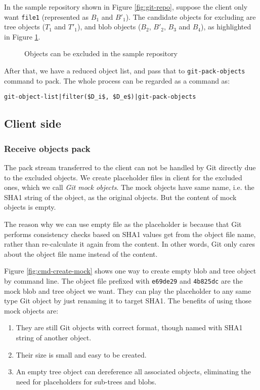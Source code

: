 \documentclass[preprint]{sigplanconf}
\begin{document}
In the sample repository shown in Figure \ref{fig:git-repo}, suppose the client only want \verb|file1| (represented as $B_1$ and $B'_1$).
The candidate objects for excluding are tree objects ($T_1$ and $T'_1$), and blob objects ($B_2$, $B'_2$, $B_3$ and $B_4$), as highlighted in Figure \ref{fig:find-obj-to-remove}.
\begin{figure}[htpb]
  \centering
  
  \caption{Objects can be excluded in the sample repository}
  \label{fig:find-obj-to-remove}
\end{figure}

After that, we have a reduced object list, and pass that to \verb|git-pack-objects| command to pack.
The whole process can be regarded as a command as:
\begin{verbatim}
git-object-list|filter($D_i$, $D_e$)|git-pack-objects
\end{verbatim}

\subsection{Client side}
\subsubsection{Receive objects pack}
The pack stream transferred to the client can not be handled by Git directly due to the excluded objects.
We create placeholder files in client for the excluded ones, which we call \emph{Git mock objects}.
The mock objects have same name, i.e. the SHA1 string of the object, as the original objects.
But the content of mock objects is empty.

The reason why we can use empty file as the placeholder is because that Git performs consistency checks based on SHA1 values get from the object file name, rather than re-calculate it again from the content. In other words, Git only cares about the object file name instead of the content.

Figure \ref{fig:cmd-create-mock} shows one way to create empty blob and tree object by command line.
The object file prefixed with \verb|e69de29| and \verb|4b825dc| are the mock blob and tree object we want.
They can play the placeholder to any same type Git object by just renaming it to target SHA1.
The benefits of using those mock objects are:
\begin{enumerate}
  \item They are still Git objects with correct format, though named with SHA1 string of another object.
  \item Their size is small and easy to be created.
  \item An empty tree object can dereference all associated objects, eliminating the need for placeholders for sub-trees and blobs.
\end{enumerate}
\end{document}
